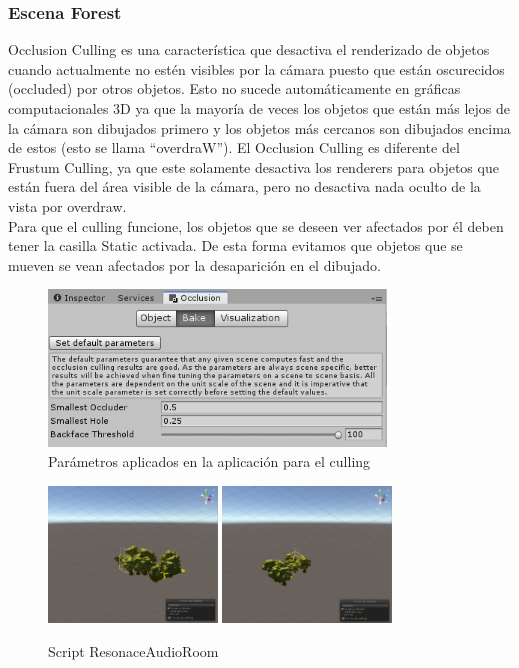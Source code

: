 	\subsubsection{Escena Forest}
\quad Occlusion Culling \cite{Culling} es una característica que desactiva el renderizado de objetos cuando actualmente no estén visibles por la cámara puesto que están oscurecidos (occluded) por otros objetos. Esto no sucede automáticamente en gráficas computacionales 3D ya que la mayoría de veces los objetos que están más lejos de la cámara son dibujados primero y los objetos más cercanos son dibujados encima de estos (esto se llama “overdraW”). El Occlusion Culling es diferente del Frustum Culling, ya que este solamente desactiva los renderers para objetos que están fuera del área visible de la cámara, pero no desactiva nada oculto de la vista por overdraw.\\

\quad Para que el culling funcione, los objetos que se deseen ver afectados por él deben tener la casilla Static activada. De esta forma evitamos que objetos que se mueven se vean afectados por la desaparición en el dibujado.\\

\begin{figure}[htb]
	\centering
	\includegraphics[width=0.8\textwidth]{./imagenes/cullingdata}
	\caption{Parámetros aplicados en la aplicación para el culling}
\end{figure}
\FloatBarrier

\begin{figure}[htb]
	\centering
	\includegraphics[width=0.40\textwidth]{./imagenes/culling1}
	\includegraphics[width=0.40\textwidth]{./imagenes/culling2}
	\caption{Script ResonaceAudioRoom}
\end{figure}
\FloatBarrier

